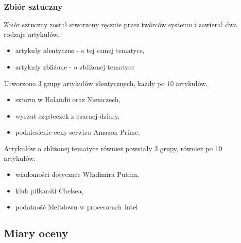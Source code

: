 \subsubsection{Zbiór sztuczny}

Zbiór sztuczny został stworzony ręcznie przez twórców systemu i zawierał dwa rodzaje
artykułów. 
\begin{itemize}
\item artykuły identyczne - o tej samej tematyce,
\item artykuły zbliżone - o zbliżonej tematyce
\end{itemize}

Utworzono 3 grupy artykułów identycznych, każdy po 10 artykułów.
\begin{itemize}
\item sztorm w Holandii oraz Niemczech,
\item wyrzut cząsteczek z czarnej dziury,
\item podniesienie ceny serwisu Amazon Prime,
\end{itemize}

Artykułów o zbliżonej tematyce również powstały 3 grupy, również po 10 artykułów.
\begin{itemize}
\item wiadomości dotyczące Władimira Putina,
\item klub piłkarski Chelsea,
\item podatność Meltdown w procesorach Intel
\end{itemize}

\subsection{Miary oceny}

